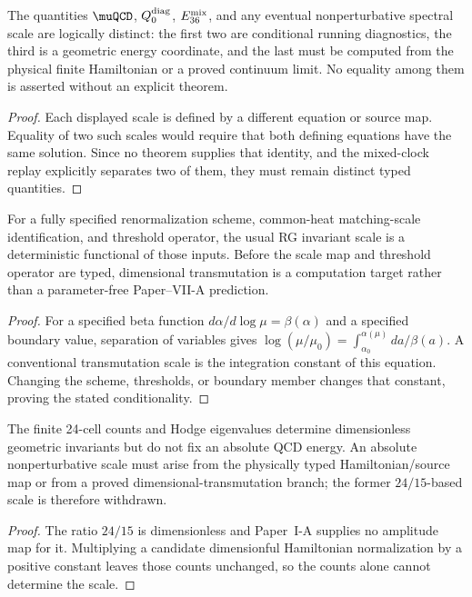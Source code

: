 \documentclass[12pt,a4paper]{article}
\begin{document}
\begin{theorem}
\label{p10:thm:handoff-scale-scheme-separation}
The quantities \(\muQCD\), \(Q_0^{\rm diag}\), \(E_{36}^{\rm mix}\), and any eventual nonperturbative spectral scale are logically distinct: the first two are conditional running diagnostics, the third is a geometric energy coordinate, and the last must be computed from the physical finite Hamiltonian or a proved continuum limit.  No equality among them is asserted without an explicit theorem.
\end{theorem}
\begin{proof}
Each displayed scale is defined by a different equation or source map.  Equality of two such scales would require that both defining equations have the same solution.  Since no theorem supplies that identity, and the mixed-clock replay explicitly separates two of them, they must remain distinct typed quantities.
\end{proof}

\begin{proposition}
\label{p10:prop:dimensional-transmutation-readout}
For a fully specified renormalization scheme, common-heat matching-scale identification, and threshold operator, the usual RG invariant scale is a deterministic functional of those inputs.  Before the scale map and threshold operator are typed, dimensional transmutation is a computation target rather than a parameter-free Paper--VII-A prediction.
\end{proposition}
\begin{proof}
For a specified beta function $d\alpha/d\log\mu=\beta(\alpha)$ and a specified boundary value, separation of variables gives $\log(\mu/\mu_0)=\int_{\alpha_0}^{\alpha(\mu)}d a/\beta(a)$.  A conventional transmutation scale is the integration constant of this equation.  Changing the scheme, thresholds, or boundary member changes that constant, proving the stated conditionality.
\end{proof}

\begin{theorem}
\label{p10:thm:native-nonperturbative-scale-ratio}
The finite 24-cell counts and Hodge eigenvalues determine dimensionless geometric invariants but do not fix an absolute QCD energy.  An absolute nonperturbative scale must arise from the physically typed Hamiltonian/source map or from a proved dimensional-transmutation branch; the former \(24/15\)-based scale is therefore withdrawn.
\end{theorem}
\begin{proof}
The ratio \(24/15\) is dimensionless and Paper~I-A supplies no amplitude map for it.  Multiplying a candidate dimensionful Hamiltonian normalization by a positive constant leaves those counts unchanged, so the counts alone cannot determine the scale.
\end{proof}
\end{document}
